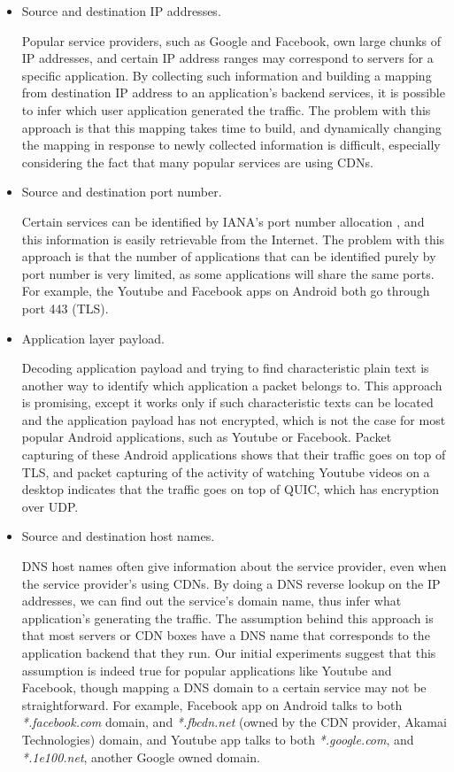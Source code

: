 \begin{itemize}
	
	\item Source and destination IP addresses. 
	
	Popular service providers, such as Google and Facebook, own large chunks of IP addresses, and certain IP address ranges may correspond to servers for a specific application. By collecting such information and building a  mapping from destination IP address to an application's backend services, it is possible to infer which user application generated the traffic. The problem with this approach is that this mapping takes time to build, and dynamically changing the mapping in response to newly collected information is difficult, especially considering the fact that many popular services are using CDNs.
	
	\item Source and destination port number. 
	
	Certain services can be identified by IANA's port number allocation \cite{PortAssignment}, and this information is easily retrievable from the Internet. The problem with this approach is that the number of applications that can be identified purely by port number is very limited, as some applications will share the same ports. For example, the Youtube and Facebook apps on Android both go through port 443 (TLS).
	
	\item Application layer payload. 
	
	Decoding application payload and trying to find characteristic plain text is another way to identify which application a packet belongs to. This approach is promising, except it works only if such characteristic texts can be located and the application payload has not encrypted, which is not the case for most popular Android applications, such as Youtube or Facebook. Packet capturing of these Android applications shows that their traffic goes on top of TLS, and packet capturing of the activity of watching Youtube videos on a desktop indicates that the traffic goes on top of QUIC, which has encryption over UDP.
	
	\item Source and destination host names. 
	
	DNS host names often give information about the service provider, even when the service provider's using CDNs. By doing a DNS reverse lookup on the IP addresses, we can find out the service's domain name, thus infer what application's generating the traffic. The assumption behind this approach is that most servers or CDN boxes have a DNS name that corresponds to the application backend that they run. Our initial experiments suggest that this assumption is indeed true for popular applications like Youtube and Facebook, though mapping a DNS domain to a certain service may not be straightforward. For example, Facebook app on Android talks to both \textit{*.facebook.com} domain, and \textit{*.fbcdn.net} (owned by the CDN provider, Akamai Technologies) domain, and Youtube app talks to both \textit{*.google.com}, and \textit{*.1e100.net}, another Google owned domain. 
	

\end{itemize}
